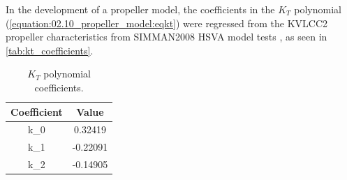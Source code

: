 In the development of a propeller model, the coefficients in the \(K_T\) polynomial (\autoref{equation:02.10_propeller_model:eqkt}) were regressed from the KVLCC2 propeller characteristics from SIMMAN2008 HSVA model tests \cite{stern_experience_2011}, as seen in \autoref{tab:kt_coefficients}.

\begin{table}[h!]
    \centering
    \caption{\(K_T\) polynomial coefficients.}
    \label{tab:kt_coefficients}
    \begin{tabular}{|c|c|}
        \hline
        Coefficient & Value \\
        \hline
        k_0 & 0.32419 \\
        k_1 & -0.22091 \\
        k_2 & -0.14905 \\
        \hline
    \end{tabular}

\end{table}

